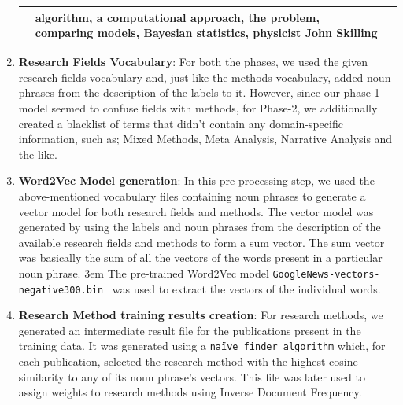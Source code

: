 \documentclass[runningheads]{llncs}
\begin{document}
\begin{enumerate}
\begin{table}
\begin{tabular}{C{1.5cm} C{5cm} C{5cm}}
 & algorithm, a computational approach, the problem, comparing models, Bayesian statistics, physicist John Skilling \\ \hline
    \end{tabular}
    \end{table}
    \smallskip
    \item \textbf{Research Fields Vocabulary}: For both the phases, we used the given research fields vocabulary and, just like the methods vocabulary, added noun phrases from the description of the labels to it. However, since our phase-1 model seemed to confuse fields with methods, for Phase-2, we additionally created a blacklist of terms that didn't contain any domain-specific information, such as; Mixed Methods, Meta Analysis, Narrative Analysis and the like.
    \smallskip
    \item \textbf{Word2Vec Model generation}: In this pre-processing step, we used the above-mentioned vocabulary files containing noun phrases to generate a vector model for both research fields and methods. %
    The vector model was generated by using the labels and noun phrases from the description of the available research fields and methods to form a sum vector.
    The sum vector was basically the sum of all the vectors of the words present in a particular noun phrase. %
    \emergencystretch 3em {The pre-trained Word2Vec model \texttt{GoogleNews-vectors-negative300.bin}~\cite{DBLP:journals/corr/abs-1301-3781} was used to extract the vectors of the individual words.}
    \smallskip
    \item \textbf{Research Method training results creation}: For research methods, we generated an intermediate %
    result file for the publications present in the training data. %
    It was generated using a \texttt{naïve finder algorithm} which, for each publication, selected the research method with the highest cosine similarity to any of its noun phrase’s vectors. This file was later used to assign weights to research methods using Inverse Document Frequency.
\end{enumerate}
\end{document}
